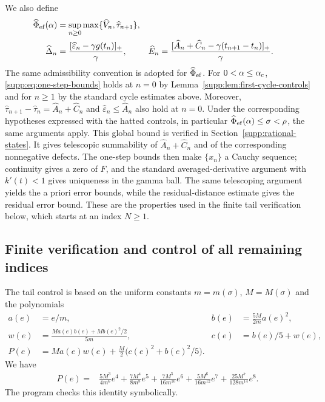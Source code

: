 \documentclass[11pt,a4paper]{article}
\numberwithin{equation}{section}
\numberwithin{table}{section}
\theoremstyle{plain}
\theoremstyle{definition}\newtheorem{definition}[theorem]{Definition}
\theoremstyle{remark}\newtheorem{remark}[theorem]{Remark}
\begin{document}
We also define
\begin{equation}
\begin{aligned}
 \widehat\Phi_{\rm ef}(\alpha)&=\sup_{n\geq0}
  \max\{\widehat V_n,\widehat\tau_{n+1}\},\\
 \widehat\Delta_n&=\frac{[\widehat\varepsilon_n-\gamma g(t_n)]_+}{\gamma},&
 \widehat E_n&=\frac{[\widehat A_n+\widehat C_n-
 \gamma(t_{n+1}-t_n)]_+}{\gamma}.
\end{aligned}
\label{supp:eq:first-cycle-defects}
\end{equation}
The same admissibility convention is adopted for
$\widehat\Phi_{\rm ef}$. For $0<\alpha\leq\alpha_{\rm c}$,
\eqref{supp:eq:one-step-bounds} holds at $n=0$ by
Lemma~\ref{supp:lem:first-cycle-controls} and for $n\geq1$ by the
standard cycle estimates above. Moreover,
$\widehat\tau_{n+1}-\widehat\tau_n=\widehat A_n+\widehat C_n$ and
$\widehat\varepsilon_n\leq\widehat A_n$ also hold at $n=0$.
Under the corresponding hypotheses expressed with the hatted controls, in particular $\widehat\Phi_{\rm ef}(\alpha)\leq\sigma<\rho$, the same arguments apply. This global bound is verified in Section~\ref{supp:rational-states}. It gives telescopic summability of
$\widehat A_n+\widehat C_n$ and of the corresponding nonnegative
defects. The one-step bounds then make $\{x_n\}$ a Cauchy sequence;
continuity gives a zero of $F$, and the standard averaged-derivative
argument with $k'(t)<1$ gives uniqueness in the gamma ball. The same
telescoping argument yields the a priori error bounds, while the
residual-distance estimate gives the residual error bound. These are
the properties used in the finite tail verification below, which
starts at an index $N\geq1$.

\subsection{Finite verification and control of all remaining indices}
The tail control is based on the uniform constants $m=m(\sigma)$,
$M=M(\sigma)$ and the polynomials
\begin{equation}
 \begin{aligned}
 a(e)&=e/m,&b(e)&=\frac{5M}{2m}a(e)^2,\\
 w(e)&=\frac{Ma(e)b(e)+Mb(e)^2/2}{5m},&c(e)&=b(e)/5+w(e),\\
 P(e)&=Ma(e)w(e)+\frac M2\bigl(c(e)^2+b(e)^2/5\bigr).
 \end{aligned}\label{supp:eq:tail-controls}
\end{equation}
We have
\begin{equation}
 \begin{aligned}
 P(e)={}&\frac{5M^3}{4m^6}e^4+\frac{7M^4}{8m^8}e^5+
 \frac{7M^5}{16m^{10}}e^6+\frac{5M^6}{16m^{12}}e^7+
 \frac{25M^7}{128m^{14}}e^8.
 \end{aligned}\label{supp:eq:tail-polynomial}
\end{equation}
The program  checks this
identity symbolically.
\end{document}
